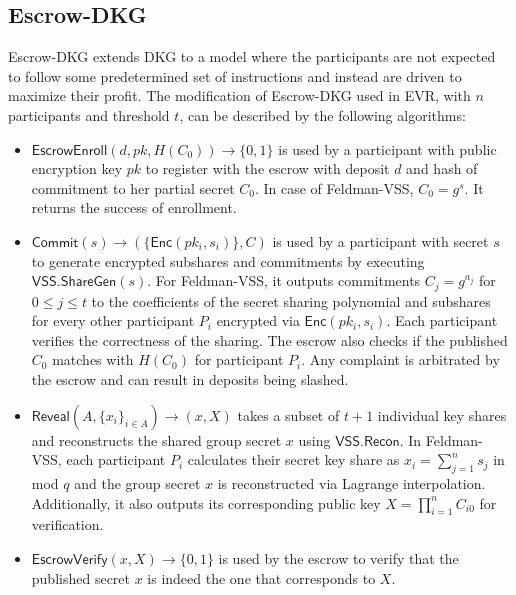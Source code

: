 \documentclass[letterpaper,twocolumn,10pt]{article}
\theoremstyle{definition}
\theoremstyle{remark}
\begin{document}
\subsection{Escrow-DKG}
\label{appendix:edkg}
\iffalse
 It does so by introducing a transparent escrow service that takes participants' deposits and can burn or redistribute them. It proceeds in similar phases as Joint-Feldman. However, any complaint of undesired behavior by a participant against another participant is arbitrated by the escrow and can result in deposits being slashed. The protocol fails once a complaint has been filed. 
\fi
Escrow-DKG \cite{david2019rational} extends DKG to a model where the participants are not expected to follow some predetermined set of instructions and instead are driven to maximize their profit. The modification of Escrow-DKG used in EVR, with $n$ participants and threshold $t$, can be described by the following algorithms:
\begin{itemize}
    \item $\mathsf{EscrowEnroll}(d, pk, H(C_{0})) \rightarrow \{0,1\}$ is used by a participant with public encryption key $pk$ to register with the escrow with deposit $d$ and hash of commitment to her partial secret $C_{0}$. In case of Feldman-VSS, $C_{0} = g^{s}$. It returns the success of enrollment.
    
    \item $\mathsf{Commit}(s) \rightarrow (\{\mathsf{Enc}(pk_i, s_{i})\}, C)$ is used by a participant with secret $s$ to generate encrypted subshares and commitments by executing $\mathsf{VSS.ShareGen}(s)$. For Feldman-VSS, it outputs commitments $C_j = g^{a_j}$ for $0 \le j \le t$ to the coefficients of the secret sharing polynomial and subshares for every other participant $P_i$ encrypted via $\mathsf{Enc}(pk_i, s_{i})$. Each participant verifies the correctness of the sharing. The escrow also checks if the published $C_{0}$ matches with $H(C_{0})$ for participant $P_i$. Any complaint is arbitrated by the escrow and can result in deposits being slashed.
    
    \item $\mathsf{Reveal}(A, \{x_i\}_{i \in A}) \rightarrow (x, X)$ takes a subset of $t + 1$ individual key shares and reconstructs the shared group secret $x$ using $\mathsf{VSS.Recon}$. In Feldman-VSS, each participant $P_i$ calculates their secret key share as $x_i = \sum_{j=1}^{n} s_j$ in mod $q$ and the group secret $x$ is reconstructed via Lagrange interpolation. Additionally, it also outputs its corresponding public key $X = \prod_{i=1}^{n} C_{i0}$ for verification.
    
    \item $\mathsf{EscrowVerify}(x, X)\rightarrow\{0,1\}$ is used by the escrow to verify that the published secret $x$ is indeed the one that corresponds to $X$.
\end{itemize}
\end{document}
